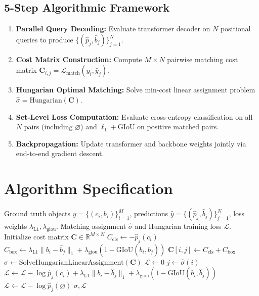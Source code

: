\documentclass[11pt,a4paper]{article}
\theoremstyle{definition}
\begin{document}
\subsection{5-Step Algorithmic Framework}
\begin{enumerate}
    \item \textbf{Parallel Query Decoding:} Evaluate transformer decoder on $N$ positional queries to produce $\{(\hat{p}_j, \hat{b}_j)\}_{j=1}^N$.
    \item \textbf{Cost Matrix Construction:} Compute $M \times N$ pairwise matching cost matrix $\mathbf{C}_{i,j} = \mathcal{L}_{\text{match}}(y_i, \hat{y}_j)$.
    \item \textbf{Hungarian Optimal Matching:} Solve min-cost linear assignment problem $\hat{\sigma} = \text{Hungarian}(\mathbf{C})$.
    \item \textbf{Set-Level Loss Computation:} Evaluate cross-entropy classification on all $N$ pairs (including $\varnothing$) and $\ell_1 + \text{GIoU}$ on positive matched pairs.
    \item \textbf{Backpropagation:} Update transformer and backbone weights jointly via end-to-end gradient descent.
\end{enumerate}

\section{Algorithm Specification}

\begin{algorithm}[H]
\caption{DETR Bipartite Assignment and Hungarian Loss}
\label{alg:detr_match}
\begin{algorithmic}[1]
\Require Ground truth objects $y = \{(c_i, b_i)\}_{i=1}^M$, predictions $\hat{y} = \{(\hat{p}_j, \hat{b}_j)\}_{j=1}^N$, loss weights $\lambda_{\text{L1}}, \lambda_{\text{giou}}$.
\Ensure Matching assignment $\hat{\sigma}$ and Hungarian training loss $\mathcal{L}$.
\State Initialize cost matrix $\mathbf{C} \in \mathbb{R}^{M \times N}$
        \State $C_{\text{cls}} \gets -\hat{p}_j(c_i)$
        \State $C_{\text{box}} \gets \lambda_{\text{L1}} \|b_i - \hat{b}_j\|_1 + \lambda_{\text{giou}} (1 - \text{GIoU}(b_i, \hat{b}_j))$
        \State $\mathbf{C}[i, j] \gets C_{\text{cls}} + C_{\text{box}}$
    \EndFor
\EndFor
\State $\hat{\sigma} \gets \text{SolveHungarianLinearAssignment}(\mathbf{C})$
\State $\mathcal{L} \gets 0$
    \State $j \gets \hat{\sigma}(i)$
    \State $\mathcal{L} \gets \mathcal{L} - \log \hat{p}_j(c_i) + \lambda_{\text{L1}} \|b_i - \hat{b}_j\|_1 + \lambda_{\text{giou}} (1 - \text{GIoU}(b_i, \hat{b}_j))$
\EndFor
{}
    \State $\mathcal{L} \gets \mathcal{L} - \log \hat{p}_j(\varnothing)$
\EndFor
\State \Return $\hat{\sigma}, \mathcal{L}$
\end{algorithmic}
\end{algorithm}
\end{document}
